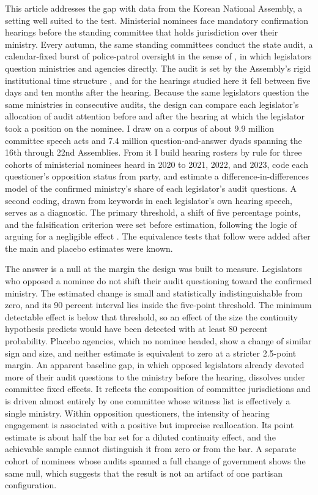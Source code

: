 \documentclass[11pt]{article}
\begin{document}
This article addresses the gap with data from the Korean National Assembly, a setting well suited to the test. Ministerial nominees face mandatory confirmation hearings before the standing committee that holds jurisdiction over their ministry. Every autumn, the same standing committees conduct the state audit, a calendar-fixed burst of police-patrol oversight in the sense of \citet{mccubbins1984}, in which legislators question ministries and agencies directly. The audit is set by the Assembly's rigid institutional time structure \citep{ka2025}, and for the hearings studied here it fell between five days and ten months after the hearing. Because the same legislators question the same ministries in consecutive audits, the design can compare each legislator's allocation of audit attention before and after the hearing at which the legislator took a position on the nominee. I draw on a corpus of about 9.9 million committee speech acts and 7.4 million question-and-answer dyads spanning the 16th through 22nd Assemblies. From it I build hearing rosters by rule for three cohorts of ministerial nominees heard in 2020 to 2021, 2022, and 2023, code each questioner's opposition status from party, and estimate a difference-in-differences model of the confirmed ministry's share of each legislator's audit questions. A second coding, drawn from keywords in each legislator's own hearing speech, serves as a diagnostic. The primary threshold, a shift of five percentage points, and the falsification criterion were set before estimation, following the logic of arguing for a negligible effect \citep{rainey2014}. The equivalence tests that follow \citet{hartman2018} were added after the main and placebo estimates were known.

The answer is a null at the margin the design was built to measure. Legislators who opposed a nominee do not shift their audit questioning toward the confirmed ministry. The estimated change is small and statistically indistinguishable from zero, and its 90 percent interval lies inside the five-point threshold. The minimum detectable effect is below that threshold, so an effect of the size the continuity hypothesis predicts would have been detected with at least 80 percent probability. Placebo agencies, which no nominee headed, show a change of similar sign and size, and neither estimate is equivalent to zero at a stricter 2.5-point margin. An apparent baseline gap, in which opposed legislators already devoted more of their audit questions to the ministry before the hearing, dissolves under committee fixed effects. It reflects the composition of committee jurisdictions and is driven almost entirely by one committee whose witness list is effectively a single ministry. Within opposition questioners, the intensity of hearing engagement is associated with a positive but imprecise reallocation. Its point estimate is about half the bar set for a diluted continuity effect, and the achievable sample cannot distinguish it from zero or from the bar. A separate cohort of nominees whose audits spanned a full change of government shows the same null, which suggests that the result is not an artifact of one partisan configuration.
\end{document}
